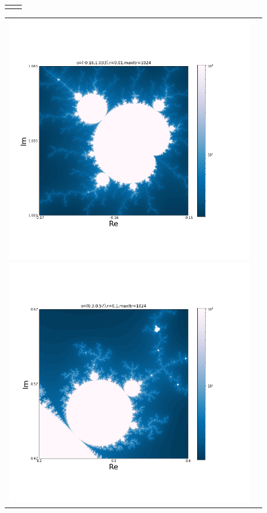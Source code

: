 \documentclass[uplatex,a4paper,11pt,oneside,openany]{jsbook}
\begin{document}
\begin{figure}[H]
\begin{tabular}{cc}
\begin{minipage}{0.5\hsize}
      \end{minipage}
    \end{tabular}
\end{figure}%

\begin{figure}[H]
  \centering
    \begin{tabular}{cc}
      \begin{minipage}{0.5\hsize}
        \centering
  \includegraphics[bb=35 100 650 600,keepaspectratio,clip,scale=0.35]{../src/figure/mandel003.png}
      \end{minipage}
      \begin{minipage}{0.5\hsize}
        \centering
  \includegraphics[bb=35 100 650 600,keepaspectratio,clip,scale=0.35]{../src/figure/mandel004.png}

\end{minipage}
\end{tabular}
\end{figure}
\end{document}
